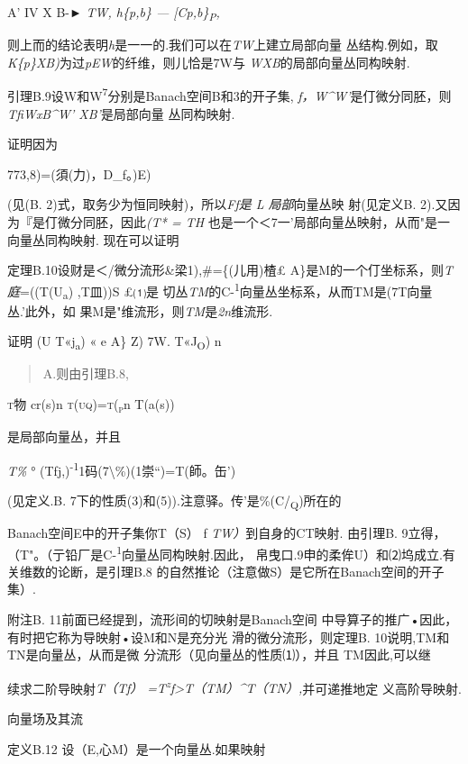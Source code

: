 A' IV X B-► \emph{TW, h\{p,b\} --- {[}Cp,b\}\textsubscript{P},}

则上而的结论表明\emph{h}是一一的.我们可以在\emph{TW}上建立局部向量
丛结构.例如，取\emph{K\{p\}XB)}为过\emph{pEW}的纤维，则儿恰是7W与
\emph{WXB}的局部向量丛同构映射.\textbar{}

引理B.9设W和W\textsuperscript{7}分别是Banach空间B和3的开子集,
\emph{f，W\^{}W'}是仃微分同胚，则\emph{TfiWxB\^{}W' XB'}是局部向量
丛同构映射.

证明因为

773,8)=(須(力)，D\_f。)E)

(见(B. 2)式，取务少为恒同映射)，所以\emph{Ff是 L 局部}向量丛映
射(见定义B. 2).又因为『是仃微分同胚，因此\emph{(T* = TH}
也是一个＜7一'局部向量丛映射，从而"是一向量丛同构映射.\textbar{}
现在可以证明

定理B.10设财是＜/微分流形\&梁1),\#=\{(儿用)楂£
A\}是M的一个仃坐标系，则\emph{T庭}=((T(U\textsubscript{a}) ,T皿))S £⑴是
切丛\emph{TM}的C-\textsuperscript{1}向量丛坐标系，从而TM是(7T向量丛.'此外，如
果M是"维流形，则\emph{TM}是\emph{2n}维流形.

证明 (U T«j\textsubscript{a}) \textbar{}« e A\} Z) 7W.
T«J\textsubscript{O}) n

\begin{quote}
A.则由引理B.8,
\end{quote}

\textsc{t}物 cr(s)n \textsc{t(uq)=t(\textsubscript{p}}n T(a(s))

是局部向量丛，并且

\emph{T\%} °
(Tfj,)\textsuperscript{-1}1码(7\textbackslash{}\%)(1崇``)=T(師。缶')

(见定义.B. 7下的性质(3)和(5)).注意驿。传'是\%(C/\textsubscript{Q})所在的

Banach空间E中的开子集你T（S） f\textbar{} \emph{TW）}到自身的CT映射.
由引理B.
9立得，（T"。（亍铅厂是C-\textsuperscript{1}向量丛同构映射.因此，
帛曳口.9申的柔侔U）和⑵坞成立.有关维数的论断，是引理B.8
的自然推论（注意做S）是它所在Banach空间的开子集）.\textbar{}

附注B. 11前面已经提到，流形间的切映射是Banach空间
中导算子的推广•因此，有时把它称为导映射•设M和N是充分光
滑的微分流形，则定理B. 10说明,TM和TN是向量丛，从而是微
分流形（见向量丛的性质⑴），并且 TM因此,可以继

续求二阶导映射\emph{T（Tf）
=T\textsuperscript{z}f\textgreater{}T（TM）\^{}T（TN）,}并可递推地定
义高阶导映射.

向量场及其流

定义B.12 设（E,心M）是一个向量丛.如果映射

